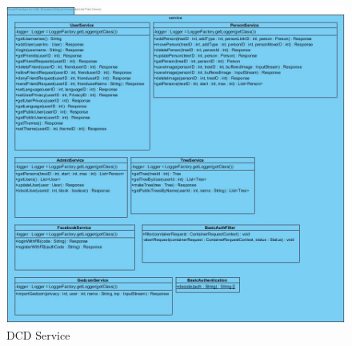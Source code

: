 \documentclass[pdftex,a4paper,12pt,twoside]{report}
\begin{document}
\begin{figure}[!htb]
\includegraphics[width=\textwidth, height=\textheight]{images/DCDService.png}
\caption{DCD Service}
\end{figure}
\end{document}
